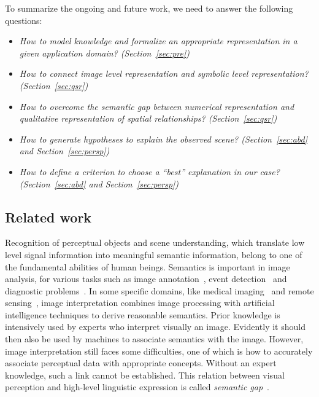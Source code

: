\documentclass{article}
\begin{document}
To summarize the ongoing and future work, we need to answer the following questions:
\begin{itemize}
 \item \textit{How to model knowledge and formalize an appropriate representation in a given application domain? (Section~\ref{sec:pre})}
 \item \textit{How to connect image level representation and symbolic level representation? (Section~\ref{sec:qsr})}
 \item \textit{How to overcome the semantic gap between numerical representation and qualitative representation of spatial relationships? (Section~\ref{sec:qsr})}
 \item \textit{How to generate hypotheses to explain the observed scene? (Section~\ref{sec:abd} and Section~\ref{sec:persp})}
 \item \textit{How to define a criterion to choose a ``best'' explanation in our case? (Section~\ref{sec:abd} and Section~\ref{sec:persp})}
\end{itemize}

 \subsection{Related work}
Recognition of perceptual objects and scene understanding, which translate low level signal information into meaningful semantic information, belong to one of the fundamental abilities of human beings.
Semantics is important in image analysis, for various tasks such as image annotation~\cite{tousch2012semantic}, event detection~\cite{lavee2009understanding} and 
diagnostic problems~\cite{atif2014explanatory,atif2007grafip}.
In some specific domains, like medical imaging~\cite{atif2014explanatory,Bloch2005fuzzy,fouquier2012sequential,nempont2013constraint} and
remote sensing~\cite{forestier2012knowledge,vanegas2010detection}, image interpretation combines image processing with artificial intelligence techniques to derive reasonable semantics.  
Prior knowledge is intensively used by experts who interpret visually an image. Evidently it should then also be used by machines to associate semantics with the image.  
However, image interpretation still faces some difficulties, one of which is how to accurately associate perceptual data with appropriate concepts. Without an expert knowledge,
such a link cannot be established. This relation between visual perception and high-level linguistic expression is called \textit{semantic gap}~\cite{hudelot2008spatial}.
\end{document}

